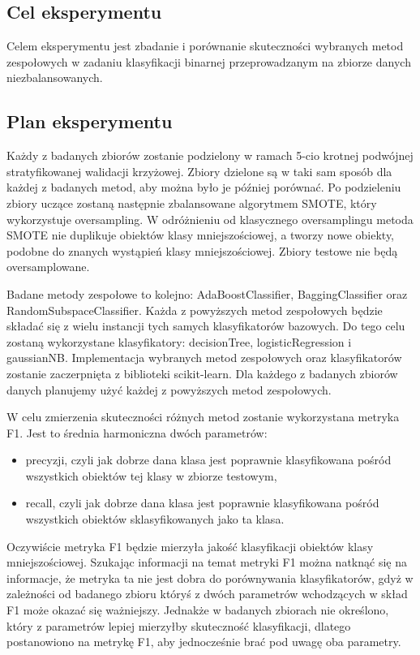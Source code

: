\documentclass[a4paper,12pt]{article}
\begin{document}
\subsection{Cel eksperymentu}
Celem eksperymentu jest zbadanie i porównanie skuteczności wybranych metod zespołowych w zadaniu klasyfikacji binarnej przeprowadzanym na zbiorze danych niezbalansowanych.
\subsection{Plan eksperymentu}
Każdy z badanych zbiorów zostanie podzielony w ramach 5-cio krotnej podwójnej stratyfikowanej walidacji krzyżowej. Zbiory dzielone są w taki sam sposób dla każdej z badanych metod, aby można było je później porównać. Po podzieleniu zbiory uczące zostaną następnie zbalansowane algorytmem SMOTE\cite{smote}, który wykorzystuje oversampling. W odróżnieniu od klasycznego oversamplingu metoda SMOTE nie duplikuje obiektów klasy mniejszościowej, a tworzy nowe obiekty, podobne do znanych wystąpień klasy mniejszościowej. Zbiory testowe nie będą oversamplowane.

Badane metody zespołowe to kolejno:
AdaBoostClassifier, BaggingClassifier oraz RandomSubspaceClassifier. Każda z powyższych metod zespołowych będzie składać się z wielu instancji tych samych klasyfikatorów bazowych. Do tego celu zostaną wykorzystane klasyfikatory: decisionTree, logisticRegression i gaussianNB. Implementacja wybranych metod zespołowych oraz klasyfikatorów zostanie zaczerpnięta z biblioteki scikit-learn\cite{scikit}. Dla każdego z badanych zbiorów danych planujemy użyć każdej z powyższych metod zespołowych.

W celu zmierzenia skuteczności różnych metod zostanie wykorzystana metryka F1\cite{f1}. Jest to średnia harmoniczna dwóch parametrów:
\begin{itemize}
    \item precyzji, czyli jak dobrze dana klasa jest poprawnie klasyfikowana pośród wszystkich obiektów tej klasy w zbiorze testowym,
    \item recall, czyli jak dobrze dana klasa jest poprawnie klasyfikowana pośród wszystkich obiektów sklasyfikowanych jako ta klasa.
\end{itemize}
Oczywiście metryka F1 będzie mierzyła jakość klasyfikacji obiektów klasy mniejszościowej. Szukając informacji na temat metryki F1 można natknąć się na informacje, że metryka ta nie jest dobra do porównywania klasyfikatorów, gdyż w zależności od badanego zbioru któryś z dwóch parametrów wchodzących w skład F1 może okazać się ważniejszy. Jednakże w badanych zbiorach nie określono, który z parametrów lepiej mierzyłby skuteczność klasyfikacji, dlatego postanowiono na metrykę F1, aby jednocześnie brać pod uwagę oba parametry.
\end{document}
